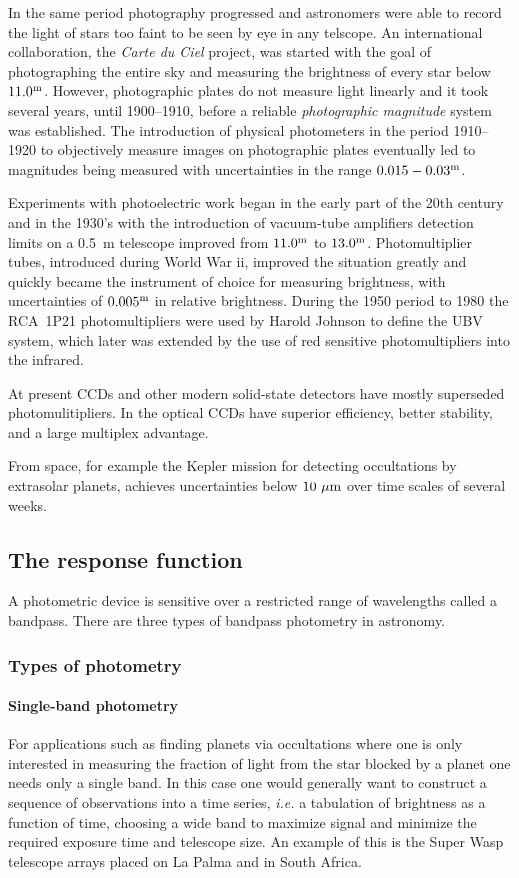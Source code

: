\documentclass{article}
\begin{document}
In the same period photography progressed and astronomers were able to
record the light of stars too faint to be seen by eye in any
telscope. An international collaboration, the {\it Carte du Ciel}
project, was started with the goal of photographing the entire sky and
measuring the brightness of every star below $11.0^{\rm m}$. However,
photographic plates do not measure light linearly and it took several
years, until 1900--1910, before a reliable {\it photographic
  magnitude} system was established. The introduction of physical
photometers in the period 1910--1920 to objectively measure images on
photographic plates eventually led to magnitudes being measured with
uncertainties in the range $0.015-0.03^{\rm m}$.

Experiments with photoelectric work began in the early part of the
20th century and in the 1930's with the introduction of vacuum-tube
amplifiers detection limits on a 0.5~m telescope improved from
$11.0^{\rm m}$ to $13.0^{\rm m}$. Photomultiplier tubes, introduced
during World War {\sc ii}, improved the situation greatly and quickly
became the instrument of choice for measuring brightness, with
uncertainties of $0.005^{\rm m}$ in relative brightness. During the
1950 period to 1980 the RCA~1P21 photomultipliers were used by Harold
Johnson to define the UBV system, which later was extended by the use
of red sensitive photomultipliers into the infrared. 

At present CCDs and other modern solid-state detectors have mostly superseded
photomulitipliers. In the optical CCDs have superior efficiency,
better stability, and a large multiplex advantage.

From space, for example the Kepler mission for detecting occultations
by extrasolar planets, achieves uncertainties below $10~\mu{\rm m}$
over time scales of several weeks.

\subsection{The response function}

A photometric device is sensitive over a restricted range of
wavelengths called a bandpass. There are three types of bandpass
photometry in astronomy.

\subsubsection{Types of photometry}

\paragraph{Single-band photometry} For applications such as finding
planets via occultations where one is only interested in measuring the
fraction of light from the star blocked by a planet one needs only a
single band. In this case one would generally want to construct a
sequence of observations into a time series, {\it i.e.} a tabulation
of brightness as a function of time, choosing a wide band to maximize
signal and minimize the required exposure time and telescope size. An
example of this is the Super Wasp telescope arrays placed on La Palma
and in South Africa.
\end{document}
